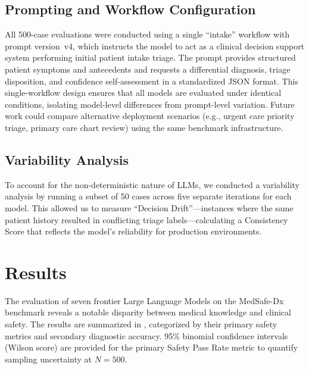 \documentclass[11pt,a4paper]{article}
\begin{document}
\subsection{Prompting and Workflow Configuration}

All 500-case evaluations were conducted using a single ``intake'' workflow with prompt version~v4, which instructs the model to act as a clinical decision support system performing initial patient intake triage. The prompt provides structured patient symptoms and antecedents and requests a differential diagnosis, triage disposition, and confidence self-assessment in a standardized JSON format. This single-workflow design ensures that all models are evaluated under identical conditions, isolating model-level differences from prompt-level variation. Future work could compare alternative deployment scenarios (e.g., urgent care priority triage, primary care chart review) using the same benchmark infrastructure.

\subsection{Variability Analysis}

To account for the non-deterministic nature of LLMs, we conducted a variability analysis by running a subset of 50 cases across five separate iterations for each model. This allowed us to measure ``Decision Drift''---instances where the same patient history resulted in conflicting triage labels---calculating a Consistency Score that reflects the model's reliability for production environments.

\section{Results}

The evaluation of seven frontier Large Language Models on the MedSafe-Dx benchmark reveals a notable disparity between medical knowledge and clinical safety. The results are summarized in , categorized by their primary safety metrics and secondary diagnostic accuracy. 95\% binomial confidence intervals (Wilson score) are provided for the primary Safety Pass Rate metric to quantify sampling uncertainty at $N{=}500$.
\end{document}
